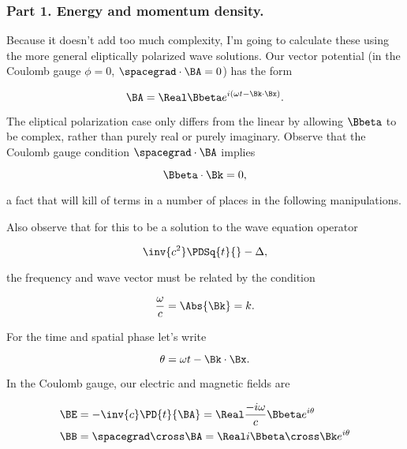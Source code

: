 \subsubsection{Part 1.  Energy and momentum density.}

Because it doesn't add too much complexity, I'm going to calculate these using the more general eliptically polarized wave solutions.  Our vector potential (in the Coulomb gauge $\phi = 0$, $\spacegrad \cdot \BA = 0$) has the form

\begin{equation}\label{eqn:relElectroDynProblemSet4:10}
\BA = \Real \Bbeta e^{i (\omega t - \Bk \cdot \Bx) }.
\end{equation}

The eliptical polarization case only differs from the linear by allowing $\Bbeta$ to be complex, rather than purely real or purely imaginary.  Observe that the Coulomb gauge condition $\spacegrad \cdot \BA$ implies

\begin{equation}\label{eqn:relElectroDynProblemSet4:30}
\Bbeta \cdot \Bk = 0,
\end{equation}

a fact that will kill of terms in a number of places in the following manipulations.

Also observe that for this to be a solution to the wave equation operator

\begin{equation}\label{eqn:relElectroDynProblemSet4:50}
\inv{c^2} \PDSq{t}{} - \Delta,
\end{equation}

the frequency and wave vector must be related by the condition

\begin{equation}\label{eqn:relElectroDynProblemSet4:70}
\frac{\omega}{c} = \Abs{\Bk} = k.
\end{equation}

For the time and spatial phase let's write

\begin{equation}\label{eqn:relElectroDynProblemSet4:90}
\theta = \omega t - \Bk \cdot \Bx.
\end{equation}

In the Coulomb gauge, our electric and magnetic fields are

\begin{align}\label{eqn:relElectroDynProblemSet4:110}
\BE &= -\inv{c}\PD{t}{\BA} = \Real \frac{-i\omega}{c} \Bbeta e^{i\theta} \\
\BB &= \spacegrad \cross \BA = \Real i \Bbeta \cross \Bk e^{i\theta}
\end{align}

